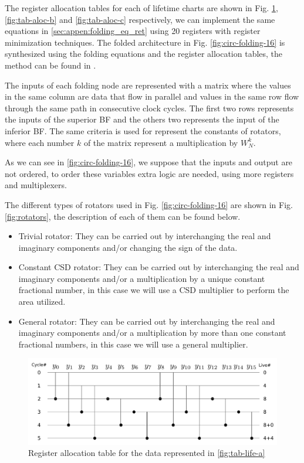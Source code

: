 \documentclass[journal,comsoc]{IEEEtran}
\begin{document}
The register allocation tables for each of lifetime charts are shown in Fig. \ref{fig:tab-aloc-a}, \ref{fig:tab-aloc-b} and \ref{fig:tab-aloc-c} respectively, we can implement the same equations in \ref{sec:appen:folding_eq_ret} using 20 registers with register minimization techniques. The folded architecture in Fig. \ref{fig:circ-folding-16} is synthesized using the folding equations and the register allocation tables, the method can be found in \cite{pipeline_parhi_book}. 

The inputs of each folding node are represented with a matrix where the values in the same column are data that flow in parallel and values in the same row
flow through the same path in consecutive clock cycles. The first two rows represents the inputs of the superior BF and the others two represents the input of the inferior BF. 
The same criteria is used for represent the constants of rotators, where each number $k$ of the matrix represent a multiplication by $W^k_N$.

As we can see in \ref{fig:circ-folding-16}, we suppose that the inputs and output are not ordered, to order these variables extra logic are needed, using more registers and multiplexers.

The different types of rotators used in Fig. \ref{fig:circ-folding-16} are shown in Fig. \ref{fig:rotators}, the description of each of them can be found below.

\begin{itemize}

\item Trivial rotator: They can be carried out by interchanging the real and imaginary components and/or changing the sign of the data.
\item Constant CSD rotator: They can be carried out by interchanging the real and imaginary components and/or a multiplication by a unique constant fractional number, in this case we will use a CSD multiplier to perform the area utilized.
\item General rotator: They can be carried out by interchanging the real and imaginary components and/or a multiplication by more than one constant fractional numbers, in this case we will use a general multiplier.

\end{itemize}

\begin{figure}[htbp]%
\centering
 \includegraphics[width=1\linewidth]{Diagramas/life_chart_a.png}%
\caption{Register allocation table for the data represented in \ref{fig:tab-life-a}}
\label{fig:tab-aloc-a}
\end{figure}
\end{document}
